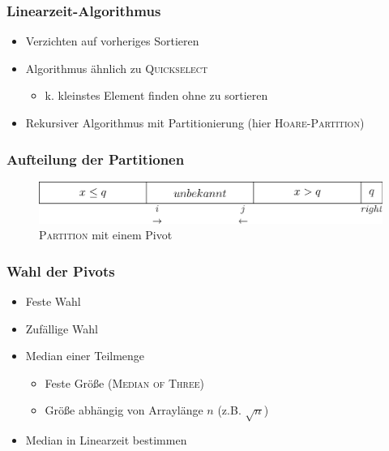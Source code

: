 \documentclass{presentation}
\begin{document}
\begin{frame}
    \frametitle{Linearzeit-Algorithmus}
    \begin{itemize}
        \item Verzichten auf vorheriges Sortieren
        \pause

        \item Algorithmus ähnlich zu \textsc{Quickselect}
        \begin{itemize}
            \item k. kleinstes Element finden ohne zu sortieren
        \end{itemize}
        \pause

        \item Rekursiver Algorithmus mit Partitionierung (hier \textsc{Hoare-Partition})
    \end{itemize}
\end{frame}



\begin{frame}
    \frametitle{Aufteilung der Partitionen}
    \begin{figure}[!htb]
        \centering
        \includegraphics[scale=.5]{res/partition1.eps}
        \caption{\textsc{Partition} mit einem Pivot}
        \label{fig:partition1}
    \end{figure}
\end{frame}



\begin{frame}
    \frametitle{Wahl der Pivots}
    \begin{itemize}
        \item Feste Wahl
        \pause

        \item Zufällige Wahl
        \pause

        \item Median einer Teilmenge
        \begin{itemize}
            \item Feste Größe (\textsc{Median of Three})
            \item Größe abhängig von Arraylänge $n$ (z.B. $\sqrt{n}$)
        \end{itemize}
        \pause

        \item Median in Linearzeit bestimmen
    \end{itemize}
\end{frame}
\end{document}
